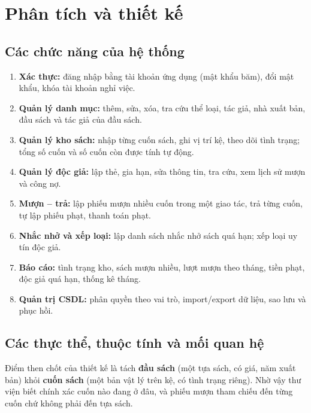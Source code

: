 \documentclass[a4paper,oneside]{report}
\begin{document}
\chapter{Phân tích và thiết kế}

\section{Các chức năng của hệ thống}
\begin{enumerate}
\item \textbf{Xác thực:} đăng nhập bằng tài khoản ứng dụng (mật khẩu băm), đổi mật khẩu, khóa tài khoản nghỉ việc.
\item \textbf{Quản lý danh mục:} thêm, sửa, xóa, tra cứu thể loại, tác giả, nhà xuất bản, đầu sách và tác giả của đầu sách.
\item \textbf{Quản lý kho sách:} nhập từng cuốn sách, ghi vị trí kệ, theo dõi tình trạng; tổng số cuốn và số cuốn còn được tính tự động.
\item \textbf{Quản lý độc giả:} lập thẻ, gia hạn, sửa thông tin, tra cứu, xem lịch sử mượn và công nợ.
\item \textbf{Mượn – trả:} lập phiếu mượn nhiều cuốn trong một giao tác, trả từng cuốn, tự lập phiếu phạt, thanh toán phạt.
\item \textbf{Nhắc nhở và xếp loại:} lập danh sách nhắc nhở sách quá hạn; xếp loại uy tín độc giả.
\item \textbf{Báo cáo:} tình trạng kho, sách mượn nhiều, lượt mượn theo tháng, tiền phạt, độc giả quá hạn, thống kê tháng.
\item \textbf{Quản trị CSDL:} phân quyền theo vai trò, import/export dữ liệu, sao lưu và phục hồi.
\end{enumerate}

\section{Các thực thể, thuộc tính và mối quan hệ}
Điểm then chốt của thiết kế là tách \textbf{đầu sách} (một tựa sách, có giá, năm xuất bản) khỏi \textbf{cuốn sách} (một bản vật lý trên kệ, có tình trạng riêng). Nhờ vậy thư viện biết chính xác cuốn nào đang ở đâu, và phiếu mượn tham chiếu đến từng cuốn chứ không phải đến tựa sách.
\end{document}
